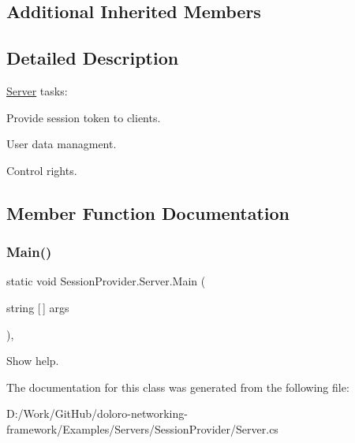 \subsection*{Additional Inherited Members}


\subsection{Detailed Description}
\mbox{\hyperlink{class_session_provider_1_1_server}{Server}} tasks\+: 


\begin{DoxyItemize}
\item Provide session token to clients.
\item User data managment.
\item Control rights. 
\end{DoxyItemize}

\subsection{Member Function Documentation}
\mbox{\label{class_session_provider_1_1_server_a78068e966b78f7579b01ba80f53b87ea}} 
\subsubsection{\texorpdfstring{Main()}{Main()}}
{\footnotesize\ttfamily static void Session\+Provider.\+Server.\+Main (\begin{DoxyParamCaption}\item[{string \mbox{[}$\,$\mbox{]}}]{args }\end{DoxyParamCaption})\hspace{0.3cm}{\ttfamily [static]}, {\ttfamily [private]}}

Show help. 

The documentation for this class was generated from the following file\+:\begin{DoxyCompactItemize}
\item 
D\+:/\+Work/\+Git\+Hub/doloro-\/networking-\/framework/\+Examples/\+Servers/\+Session\+Provider/Server.\+cs\end{DoxyCompactItemize}
